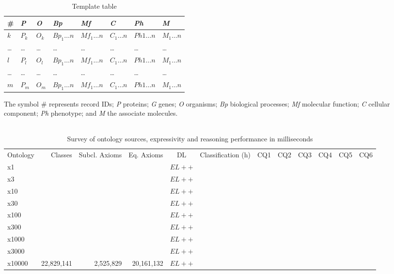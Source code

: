 \documentclass{bmcart}
\begin{document}
\begin{backmatter}
\begin{table}[h!]
	\centering
	\caption{Template table}
	\label{table:template}
	\begin{tabular}{p{0.3in}p{0.3in}p{0.3in}p{0.6in}p{0.6in}p{0.6in}p{0.6in}p{0.6in}} \hline 
		\# & \textit{P} &\textit{O} & \textit{Bp} & \textit{Mf} & \textit{C} & \textit{Ph} & \textit{M} \\ \hline 
		$k$ & $P_k$ & $O_k$ & $Bp_1\ldots n$ & $Mf_1\ldots n$ & $C_1\ldots n$ & $Ph1\ldots n$ & $M_1\ldots n$ \\
		\ldots & \ldots & \ldots & \ldots & \ldots & \ldots & \ldots & \ldots \\
		$l$ & $P_l$ & $O_l$ & $Bp_1\ldots n$ & $Mf_1\ldots n$ & $C_1\ldots n$ & $Ph1\ldots n$ & $M_1\ldots n$ \\
		\ldots & \ldots & \ldots & \ldots & \ldots & \ldots & \ldots & \ldots \\
		$m$ & $P_m$ & $O_m$ & $Bp_1\ldots n$ & $Mf_1\ldots n$ & $C_1\ldots n$ & $Ph1\ldots n$ & $M_1\ldots n$ \\ \hline 
	\end{tabular}
	\begin{tablenotes}
		\item The symbol \# represents record IDs; \textit{P} proteins; \textit{G} genes; \textit{O} organisms; \textit{Bp} biological processes;
		\textit{Mf} molecular function; \textit{C} cellular component; \textit{Ph} phenotype; and \textit{M} the associate molecules. \\ \\
	\end{tablenotes}
\end{table}

\begin{table}[h!]
	\begin{minipage}{\textwidth}
		\label{table:Summary}
		\caption{Survey of ontology sources, expressivity and reasoning performance in milliseconds}
		\centering
		\begin{tabular}{lrrrcrrrrrrr}
			\hline Ontology & Classes & Subcl. Axioms & Eq. Axioms & DL & Classification (h) & CQ1 & CQ2 & CQ3 & CQ4 & CQ5 & CQ6 \\ 
			x1     &  &  &  & $EL++$  &  &  &  &  &  &   &  \\ 
			x3     &  & &  & $EL++$  &  &  &  &  &   &   &   \\ 
			x10    &  &   &  & $EL++$ &  & &  &  &  &  &  \\ 
			x30    &  &  &  & $EL++$ &   &  &  &   &   &  &    \\ 
			x100   &  &  &  & $EL++$ &   &  &  &   &   &  &    \\ 
			x300   &  &  &  & $EL++$ &   &  &  &   &   &  &    \\ 
			x1000  &  &  &  & $EL++$ &   &  &  &   &   &  &    \\ 
			x3000  &  &  &  & $EL++$ &   &  &  &   &   &  &    \\ 
			x10000 & 22,829,141  & 2,525,829 & 20,161,132  & $EL++$ &   &  &  &   &   &  &    \\ 


\end{tabular}
\end{minipage}
\end{table}
\end{backmatter}
\end{document}
